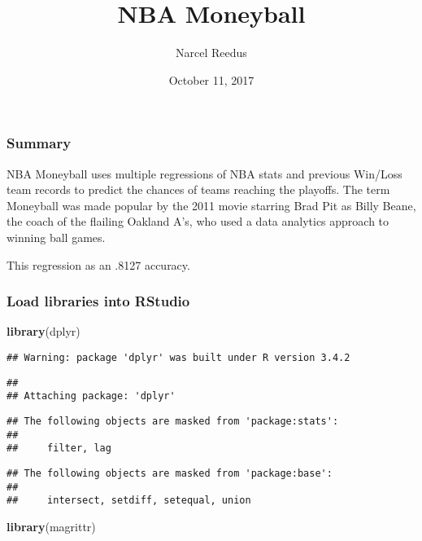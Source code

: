\documentclass[]{article}
\title{NBA Moneyball}
\author{Narcel Reedus}
\date{October 11, 2017}
\newenvironment{Shaded}{\begin{snugshade}}{\end{snugshade}}
\newcommand{\KeywordTok}[1]{\textcolor[rgb]{0.13,0.29,0.53}{\textbf{{#1}}}}
\newcommand{\NormalTok}[1]{{#1}}
\begin{document}
\maketitle

\subsubsection{Summary}\label{summary}

NBA Moneyball uses multiple regressions of NBA stats and previous
Win/Loss team records to predict the chances of teams reaching the
playoffs. The term Moneyball was made popular by the 2011 movie starring
Brad Pit as Billy Beane, the coach of the flailing Oakland A's, who used
a data analytics approach to winning ball games.

This regression as an .8127 accuracy.

\subsubsection{Load libraries into
RStudio}\label{load-libraries-into-rstudio}

\begin{Shaded}
\begin{Highlighting}[]
\KeywordTok{library}\NormalTok{(dplyr)}
\end{Highlighting}
\end{Shaded}

\begin{verbatim}
## Warning: package 'dplyr' was built under R version 3.4.2
\end{verbatim}

\begin{verbatim}
## 
## Attaching package: 'dplyr'
\end{verbatim}

\begin{verbatim}
## The following objects are masked from 'package:stats':
## 
##     filter, lag
\end{verbatim}

\begin{verbatim}
## The following objects are masked from 'package:base':
## 
##     intersect, setdiff, setequal, union
\end{verbatim}

\begin{Shaded}
\begin{Highlighting}[]
\KeywordTok{library}\NormalTok{(magrittr)}
\end{Highlighting}
\end{Shaded}
\end{document}
